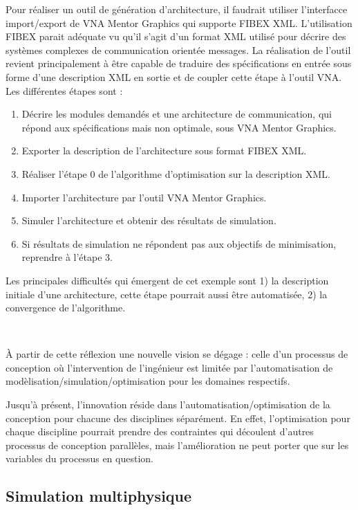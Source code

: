Pour réaliser un outil de génération d’architecture, il faudrait utiliser
l’interfacce import/export de VNA Mentor Graphics qui supporte FIBEX XML.
L’utilisation FIBEX parait adéquate vu qu’il s’agit d’un format XML
utilisé pour décrire des systèmes complexes de communication orientée messages.
La réalisation de l’outil revient principalement à être capable de traduire des
spécifications en entrée sous forme d’une description XML en sortie et de
coupler cette étape à l’outil VNA. Les différentes étapes sont :
\begin{enumerate}
\item Décrire les modules demandés et une architecture de communication, qui
répond aux spécifications mais non optimale, sous VNA Mentor Graphics.
\item Exporter la description de l’architecture sous format FIBEX XML.
\item Réaliser l’étape 0 de l’algorithme d’optimisation sur la description XML.
\item Importer l’architecture par l’outil VNA Mentor Graphics.
\item Simuler l’architecture et obtenir des résultats de simulation.
\item Si résultats de simulation ne répondent pas aux objectifs de minimisation,
reprendre à l’étape 3.
\end{enumerate}

Les principales difficultés qui émergent de cet exemple sont 1) la description
initiale d'une architecture, cette étape pourrait aussi être automatisée, 2) la
convergence de l'algorithme.

~

\`A partir de cette réflexion une nouvelle vision se dégage : celle d'un
processus de conception où l'intervention de l'ingénieur est limitée par
l'automatisation de modèlisation/simulation/optimisation pour les domaines
respectifs.

Jusqu'à présent, l'innovation réside dans l'automatisation/optimisation de la
conception pour chacune des disciplines séparément. En effet, l'optimisation
pour chaque discipline pourrait prendre des contraintes qui découlent d'autres
processus de conception parallèles, mais l'amélioration ne peut porter que sur
les variables du processus en question.

\subsection{Simulation multiphysique}

